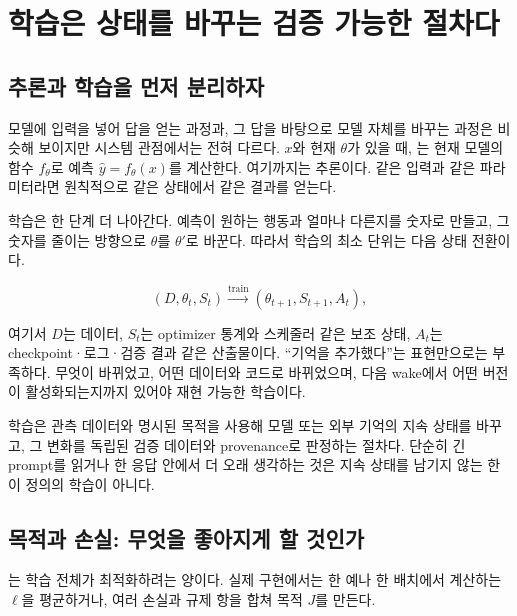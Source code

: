 \chapter{학습은 상태를 바꾸는 검증 가능한 절차다}
\label{bg:chapter-learning-objectives}

\section{추론과 학습을 먼저 분리하자}

모델에 입력을 넣어 답을 얻는 과정과, 그 답을 바탕으로 모델 자체를 바꾸는 과정은
비슷해 보이지만 시스템 관점에서는 전혀 다르다.  $x$와 현재
 $\theta$가 있을 때, 는
현재 모델의 함수 $f_\theta$로 예측 $\hat y=f_\theta(x)$를 계산한다. 여기까지는
추론이다. 같은 입력과 같은 파라미터라면 원칙적으로 같은 상태에서 같은 결과를 얻는다.

학습은 한 단계 더 나아간다. 예측이 원하는 행동과 얼마나 다른지를 숫자로 만들고,
그 숫자를 줄이는 방향으로 $\theta$를 $\theta'$로 바꾼다. 따라서 학습의 최소 단위는
다음 상태 전환이다.

\begin{equation}
  (D,\theta_t,S_t) \xrightarrow{\text{train}} (\theta_{t+1},S_{t+1},A_t),
  \label{eq:bg-training-transition}
\end{equation}

여기서 $D$는 데이터, $S_t$는 optimizer 통계와 스케줄러 같은 보조 상태,
$A_t$는 checkpoint·로그·검증 결과 같은 산출물이다. ``기억을 추가했다''는 표현만으로는
부족하다. 무엇이 바뀌었고, 어떤 데이터와 코드로 바뀌었으며, 다음 wake에서 어떤 버전이
활성화되는지까지 있어야 재현 가능한 학습이다.

\begin{definitionbox}[학습]
학습은 관측 데이터와 명시된 목적을 사용해 모델 또는 외부 기억의 지속 상태를 바꾸고,
그 변화를 독립된 검증 데이터와 provenance로 판정하는 절차다. 단순히 긴 prompt를 읽거나
한 응답 안에서 더 오래 생각하는 것은 지속 상태를 남기지 않는 한 이 정의의 학습이 아니다.
\end{definitionbox}

\section{목적과 손실: 무엇을 좋아지게 할 것인가}

는 학습 전체가 최적화하려는 양이다. 실제 구현에서는
한 예나 한 배치에서 계산하는  $\ell$을 평균하거나, 여러 손실과
규제 항을 합쳐 목적 $J$를 만든다.


